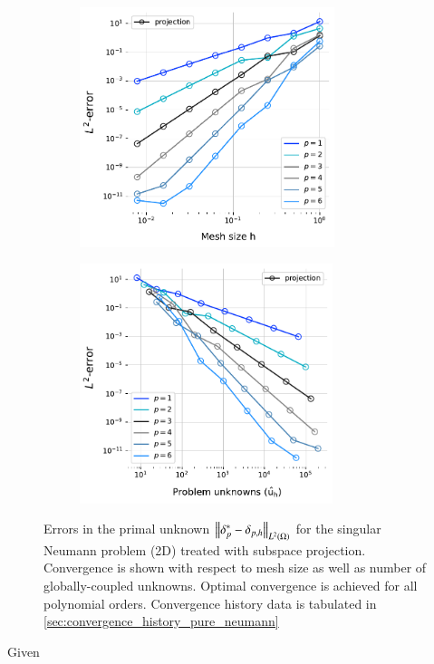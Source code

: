 \begin{figure}[ht]
    \centering
    \begin{subfigure}{0.45\textwidth}
        \includegraphics[height=7cm]{img/PNP_conv_2D.pdf}
    \end{subfigure}
    \begin{subfigure}{0.45\textwidth}
        \includegraphics[height=7cm]{img/PNP_conv_2D_dofs.pdf}
    \end{subfigure}
    \caption{Errors in the primal unknown $\left\lVert \delta_p^* - \delta_{p,h} \right\rVert_{L^2(\Omega)} $ for the singular Neumann problem (2D) treated with subspace projection. Convergence is shown with respect to mesh size as well as number of globally-coupled unknowns. Optimal convergence is achieved for all polynomial orders.
    Convergence history data is tabulated in \ref{sec:convergence_history_pure_neumann}}
    \label{fig:INS:convergence_singular_system_projection}
\end{figure}

Given


